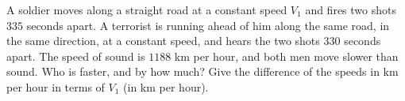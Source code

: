 A soldier moves along a straight road at a constant speed $V_1$ and fires two shots $335$ seconds apart. A terrorist is running ahead of him along the same road, in the same direction, at a constant speed, and hears the two shots $330$ seconds apart. The speed of sound is $1188$ km per hour, and both men move slower than sound. Who is faster, and by how much? Give the difference of the speeds in km per hour in terms of $V_1$ (in km per hour).
